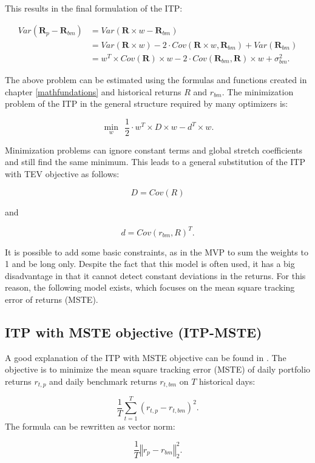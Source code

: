\documentclass[
  oneside, a4paper, 12pt, openany]{book}
\theoremstyle{definition}
\theoremstyle{definition}
\theoremstyle{definition}
\theoremstyle{definition}
\theoremstyle{remark}
\begin{document}
This results in the final formulation of the ITP:

\begin{align*}
  Var(\pmb{R}_{p}-\pmb{R}_{bm}) & = Var(\pmb{R} \times w - \pmb{R}_{bm}) \\
  & = Var(\pmb{R} \times w) - 2 \cdot Cov(\pmb{R} \times w,\pmb{R}_{bm}) + Var(\pmb{R}_{bm})  \\
  & = w^T \times Cov(\pmb{R}) \times w - 2 \cdot Cov(\pmb{R}_{bm}, \pmb{R}) \times w + \sigma_{bm}^2.
  \label{eq:ITP}
\end{align*}

The above problem can be estimated using the formulas and functions created in chapter \ref{mathfundations} and historical returns \(R\) and \(r_{bm}\). The minimization problem of the ITP in the general structure required by many optimizers is:

\[
  \min\limits_{w} \ \ \frac{1}{2} \cdot w^T \times D \times w -d^T \times w.
\]

Minimization problems can ignore constant terms and global stretch coefficients and still find the same minimum. This leads to a general substitution of the ITP with TEV objective as follows:

\[
  D = Cov(R)
\]

and

\[
d = Cov(r_{bm}, R)^T.
\]

It is possible to add some basic constraints, as in the MVP to sum the weights to 1 and be long only. Despite the fact that this model is often used, it has a big disadvantage in that it cannot detect constant deviations in the returns. For this reason, the following model exists, which focuses on the mean square tracking error of returns (MSTE).

\hypertarget{ITPMSTE}{%
\subsection{ITP with MSTE objective (ITP-MSTE)}\label{ITPMSTE}}

A good explanation of the ITP with MSTE objective can be found in \citep{AhBa2017}. The objective is to minimize the mean square tracking error (MSTE) of daily portfolio returns \(r_{t, p}\) and daily benchmark returns \(r_{t, bm}\) on \(T\) historical days:

\[
  \frac{1}{T} \sum^T_{t=1}(r_{t, p}-r_{t, bm})^2.
\]
The formula can be rewritten as vector norm:

\[
  \frac{1}{T} \left\Vert r_{p}-r_{bm} \right\Vert_2^2.
\]
\end{document}
